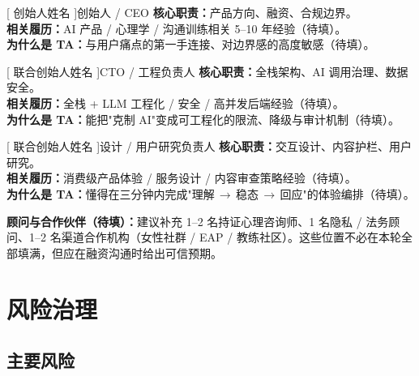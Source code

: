 \documentclass[UTF8,11pt,a4paper]{ctexart}
\begin{document}
\vspace{2mm}
\noindent
\begin{minipage}[t]{0.31\textwidth}
\begin{teamcard}{[ 创始人姓名 ]}{创始人 / CEO}
\textbf{核心职责：}产品方向、融资、合规边界。\\
\textbf{相关履历：}AI 产品 / 心理学 / 沟通训练相关 5--10 年经验（待填）。\\
\textbf{为什么是 TA：}与用户痛点的第一手连接、对边界感的高度敏感（待填）。
\end{teamcard}
\end{minipage}\hfill
\begin{minipage}[t]{0.31\textwidth}
\begin{teamcard}{[ 联合创始人姓名 ]}{CTO / 工程负责人}
\textbf{核心职责：}全栈架构、AI 调用治理、数据安全。\\
\textbf{相关履历：}全栈 + LLM 工程化 / 安全 / 高并发后端经验（待填）。\\
\textbf{为什么是 TA：}能把"克制 AI"变成可工程化的限流、降级与审计机制（待填）。
\end{teamcard}
\end{minipage}\hfill
\begin{minipage}[t]{0.31\textwidth}
\begin{teamcard}{[ 联合创始人姓名 ]}{设计 / 用户研究负责人}
\textbf{核心职责：}交互设计、内容护栏、用户研究。\\
\textbf{相关履历：}消费级产品体验 / 服务设计 / 内容审查策略经验（待填）。\\
\textbf{为什么是 TA：}懂得在三分钟内完成"理解\,$\to$\,稳态\,$\to$\,回应"的体验编排（待填）。
\end{teamcard}
\end{minipage}

\vspace{4mm}
\begin{keyfinding}
\textbf{顾问与合作伙伴（待填）：}建议补充 1--2 名持证心理咨询师、1 名隐私 / 法务顾问、1--2 名渠道合作机构（女性社群 / EAP / 教练社区）。这些位置不必在本轮全部填满，但应在融资沟通时给出可信预期。
\end{keyfinding}

\section{风险治理}

\subsection{主要风险}
\end{document}
